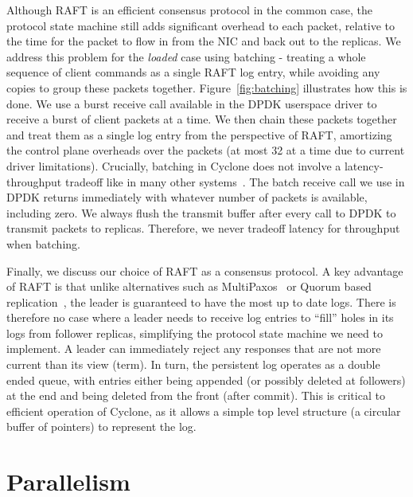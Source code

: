\documentclass[pageno]{jpaper}
\begin{document}
Although RAFT is an efficient consensus protocol in the common case, the
protocol state machine still adds significant overhead to each packet, relative
to the time for the packet to flow in from the NIC and back out to the replicas.
We address this problem for the \emph{loaded} case using batching - treating a
whole sequence of client commands as a single RAFT log entry, while avoiding any
copies to group these packets together. Figure~\ref{fig:batching} illustrates
how this is done. We use a burst receive call available in the DPDK userspace
driver to receive a burst of client packets at a time. We then chain these
packets together and treat them as a single log entry from the perspective of
RAFT, amortizing the control plane overheads over the packets (at most 32 at a
time due to current driver limitations). Crucially, batching in Cyclone does not
involve a latency-throughput tradeoff like in many other
systems~\cite{ix-dataplane}. The batch receive call we use in DPDK returns
immediately with whatever number of packets is available, including zero. We
always flush the transmit buffer after every call to DPDK to transmit packets to
replicas. Therefore, we never tradeoff latency for throughput when batching. 

Finally, we discuss our choice of RAFT as a consensus protocol. A key advantage
of RAFT is that unlike alternatives such as MultiPaxos~\cite{multipaxos} or
Quorum based replication~\cite{quorum}, the leader is guaranteed to have the
most up to date logs. There is therefore no case where a leader needs to receive
log entries to ``fill'' holes in its logs from follower replicas, simplifying
the protocol state machine we need to implement. A leader can immediately reject
any responses that are not more current than its view (term). In turn, the
persistent log operates as a double ended queue, with entries either being
appended (or possibly deleted at followers) at the end and being deleted from
the front (after commit). This is critical to efficient operation of Cyclone, as
it allows a simple top level structure (a circular buffer of pointers) to
represent the log.

\section{Parallelism}
\label{sec:parallelism}

\end{document}
